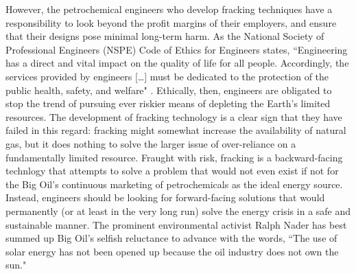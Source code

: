 \documentclass[12pt,letterpaper]{article}
\begin{document}
However, the petrochemical engineers who develop fracking techniques have a responsibility to look beyond the profit margins of their employers, and ensure that their designs pose minimal long-term harm.
As the National Society of Professional Engineers (NSPE) Code of Ethics for Engineers states, 
``Engineering has a direct and vital impact on the quality of life for all people. Accordingly, the services provided by engineers [\ldots] must be dedicated to the protection of the public health, safety, and welfare" \cite{ethics}.
Ethically, then, engineers are obligated to stop the trend of pursuing ever riskier means of depleting the Earth's limited resources. The development of fracking technology is a clear sign that they have failed in this regard: fracking might somewhat increase the availability of natural gas, but it does nothing to solve the larger issue of over-reliance on a fundamentally limited resource. Fraught with risk, fracking is a backward-facing technlogy that attempts to solve a problem that would not even exist if not for the Big Oil's continuous marketing of petrochemicals as the ideal energy source. Instead, engineers should be looking for forward-facing solutions that would permanently (or at least in the very long run) solve the energy crisis in a safe and sustainable manner.
The prominent environmental activist Ralph Nader has best summed up Big Oil's selfish reluctance to advance with the words, ``The use of solar energy has not been opened up because the oil industry does not own the sun."
\end{document}
